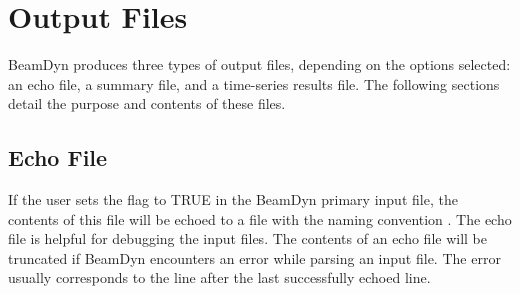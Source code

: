 \chapter{Output Files}
\label{sec:OutputFiles}

BeamDyn produces three types of output files, depending on the options selected: an echo file, a summary file, and a time-series results file. 
The following sections detail the purpose and contents of these files.

\section{Echo File}
If the user sets the   flag to TRUE in the BeamDyn primary input file, the contents of this file will be echoed to a file with the naming convention  . 
The echo file is helpful for debugging the input files. 
The contents of an echo file will be truncated if BeamDyn encounters an error while parsing an input file. 
The error usually corresponds to the line after the last successfully echoed line.

